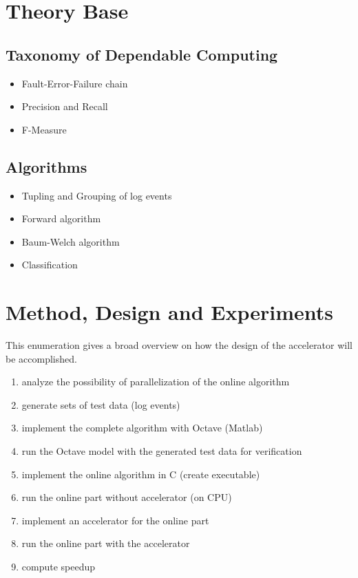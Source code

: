 \documentclass[12pt]{article} %
\begin{document}
\section{Theory Base} %


\subsection{Taxonomy of Dependable Computing} %
\begin{itemize} %
    \item Fault-Error-Failure chain \cite{IEEE04_Avizienis}
    \item Precision and Recall \cite{rijsbergen79}
    \item F-Measure \cite{DARPA99_Makhoul}
\end{itemize} 


\subsection{Algorithms} %
\begin{itemize} %
    \item Tupling and Grouping of log events
    \item Forward algorithm
    \item Baum-Welch algorithm
    \item Classification
\end{itemize} 


\section{Method, Design and Experiments} %

This enumeration gives a broad overview on how the design of the accelerator
will be accomplished.
\begin{enumerate}
    \item analyze the possibility of parallelization of the online algorithm
    \item generate sets of test data (log events)
    \item implement the complete algorithm with Octave (Matlab)
    \item run the Octave model with the generated test data for verification
    \item implement the online algorithm in C (create executable)
    \item run the online part without accelerator (on CPU)
    \item implement an accelerator for the online part
    \item run the online part with the accelerator
    \item compute speedup
\end{enumerate}
\end{document}
